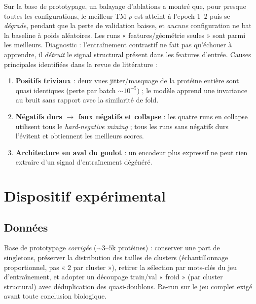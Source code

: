 \documentclass[11pt,a4paper]{article}
\begin{document}
Sur la base de prototypage, un balayage d'ablations a montré que, pour presque toutes
les configurations, le meilleur TM-$\rho$ est atteint à l'epoch 1--2 puis se
\emph{dégrade}, pendant que la perte de validation baisse, et \emph{aucune}
configuration ne bat la baseline à poids aléatoires. Les runs « features/géométrie
seules » sont parmi les meilleurs. Diagnostic : l'entraînement contrastif ne fait pas
qu'échouer à apprendre, il \emph{détruit} le signal structural présent dans les
features d'entrée. Causes principales identifiées dans la revue de littérature :
\begin{enumerate}[leftmargin=1.5em,itemsep=2pt]
  \item \textbf{Positifs triviaux} : deux vues jitter/masquage de la protéine entière
        sont quasi identiques (perte par batch $\sim 10^{-5}$) ; le modèle apprend une
        invariance au bruit sans rapport avec la similarité de fold.
  \item \textbf{Négatifs durs $\to$ faux négatifs et collapse} : les quatre runs en
        collapse utilisent tous le \emph{hard-negative mining} ; tous les runs sans
        négatifs durs l'évitent et obtiennent les meilleurs scores.
  \item \textbf{Architecture en aval du goulot} : un encodeur plus expressif ne peut
        rien extraire d'un signal d'entraînement dégénéré.
\end{enumerate}

\section{Dispositif expérimental}
\label{sec:dispositif}

\subsection{Données}
Base de prototypage \emph{corrigée} ($\sim 3$--$5$k protéines) : conserver une part
de singletons, préserver la distribution des tailles de clusters (échantillonnage
proportionnel, pas « 2 par cluster »), retirer la sélection par mots-clés du jeu
d'entraînement, et adopter un découpage train/val « froid » (par cluster structural)
avec déduplication des quasi-doublons. Re-run sur le jeu complet exigé avant toute
conclusion biologique.
\end{document}
